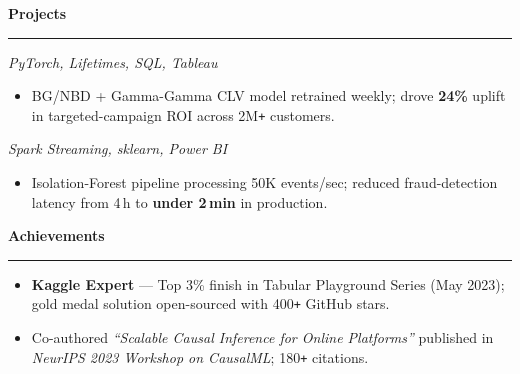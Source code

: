 \documentclass[10pt]{article}
\newlength{\sbw}\setlength{\sbw}{72mm}
\newcommand{\mainheading}[1]{%
  \vspace{5pt}%
  {\color{accent}\bfseries\large #1}\\[-2pt]%
  {\color{accent}\rule{\dimexpr\paperwidth-\sbw-14mm\relax}{1.2pt}}%
  \vspace{2pt}%
}
\begin{document}
\begin{minipage}[t]{\dimexpr\paperwidth-\sbw\relax}
\begin{minipage}[t]{\dimexpr\paperwidth-\sbw-14mm\relax}
  \mainheading{Projects}

  \hfill{\small\itshape PyTorch, Lifetimes, SQL, Tableau}\\
  \begin{itemize}[leftmargin=*,topsep=1pt,itemsep=0pt,parsep=0pt]
    \item BG/NBD + Gamma-Gamma CLV model retrained weekly; drove \textbf{24\%}
          uplift in targeted-campaign ROI across 2M\texttt{+} customers.
  \end{itemize}

  \vspace{2pt}
  \hfill{\small\itshape Spark Streaming, sklearn, Power BI}\\
  \begin{itemize}[leftmargin=*,topsep=1pt,itemsep=0pt,parsep=0pt]
    \item Isolation-Forest pipeline processing 50K events/sec; reduced
          fraud-detection latency from 4\,h to \textbf{under 2\,min} in production.
  \end{itemize}

  \mainheading{Achievements}

  \begin{itemize}[leftmargin=*,topsep=1pt,itemsep=0pt,parsep=0pt]
    \item \textbf{Kaggle Expert} --- Top 3\% finish in Tabular Playground Series
          (May 2023); gold medal solution open-sourced with 400\texttt{+} GitHub stars.
    \item Co-authored \textit{``Scalable Causal Inference for Online Platforms''}
          published in \textit{NeurIPS 2023 Workshop on CausalML}; 180\texttt{+} citations.
  \end{itemize}

\end{minipage}\end{minipage}
\end{document}
